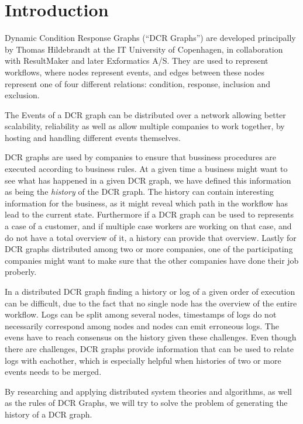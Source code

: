 \chapter{Introduction}
	Dynamic Condition Response Graphs (“DCR Graphs”) are developed principally by Thomas Hildebrandt at the IT University of Copenhagen, in collaboration with ResultMaker and later Exformatics A/S. They are used to represent workflows, where nodes represent events, and edges between these nodes represent one of four different relations: condition, response, inclusion and exclusion. 
	
	\newpar The Events of a DCR graph can be distributed over a network allowing better scalability, reliability as well as allow multiple companies to work together, by hosting and handling different events themselves. 
	
	\newpar DCR graphs are used by companies to ensure that bussiness procedures are executed according to business rules. At a given time a business might want to see what has happened in a given DCR graph, we have defined this information as being the \textit{history} of the DCR graph. The history can contain interesting information for the business, as it might reveal which path in the workflow has lead to the current state. Furthermore if a DCR graph can be used to represents a case of a customer, and if multiple case workers are working on that case, and do not have a total overview of it, a history can provide that overview. Lastly for DCR graphs distributed among two or more companies, one of the participating companies might want to make sure that the other companies have done their job proberly.
	
	\newpar In a distributed DCR graph finding a history or log of a given order of execution can be difficult, due to the fact that no single node has the overview of the entire workflow. Logs can be split among several nodes, timestamps of logs do not necessarily correspond among nodes and nodes can emit erroneous logs. The evens have to reach consensus on the history given these challenges. Even though there are challenges, DCR graphs provide information that can be used to relate logs with eachother, which is especially helpful when histories of two or more events needs to be merged.
	
	\newpar By researching and applying distributed system theories and algorithms, as well as the rules of DCR Graphs, we will try to solve the problem of generating the history of a DCR graph. 